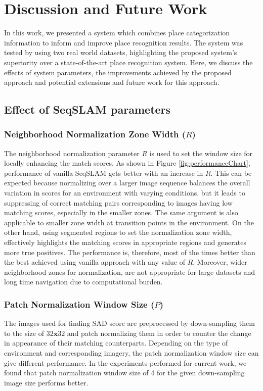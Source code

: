 \documentclass[letterpaper, 10 pt, conference]{ieeeconf}  %
\begin{document}
\section{Discussion and Future Work}
In this work, we presented a system which combines place categorization information to inform and improve place recognition results. The system was tested by using two real world datasets, highlighting the proposed system's superiority over a state-of-the-art place recognition system. Here, we discuss the effects of system parameters, the improvements achieved by the proposed approach and potential extensions and future work for this approach. 

\subsection{Effect of SeqSLAM parameters}
\subsubsection{Neighborhood Normalization Zone Width ($R$)}
The neighborhood normalization parameter $R$ is used to set the window size for locally enhancing the match scores. As shown in Figure \ref{fig:performanceChart}, performance of vanilla SeqSLAM gets better with an increase in $R$. This can be expected because normalizing over a larger image sequence balances the overall variation in scores for an environment with varying conditions, but it leads to suppressing of correct matching pairs corresponding to images having low matching scores, especially in the smaller zones. The same argument is also applicable to smaller zone width at transition points in the environment. On the other hand, using segmented regions to set the normalization zone width, effectively highlights the matching scores in appropriate regions and generates more true positives. The performance is, therefore, most of the times better than the best achieved using vanilla approach with any value of $R$. Moreover, wider neighborhood zones for normalization, are not appropriate for large datasets and long time navigation due to computational burden. 

\subsubsection{Patch Normalization Window Size ($P$)}
The images used for finding SAD score are preprocessed by down-sampling them to the size of $32\mathbf{x}32$ and patch normalizing them in order to counter the change in appearance of their matching counterparts. Depending on the type of environment and corresponding imagery, the patch normalization window size can give different performance. In the experiments performed for current work, we found that patch normalization window size of 4 for the given down-sampling image size performs better.
\end{document}
